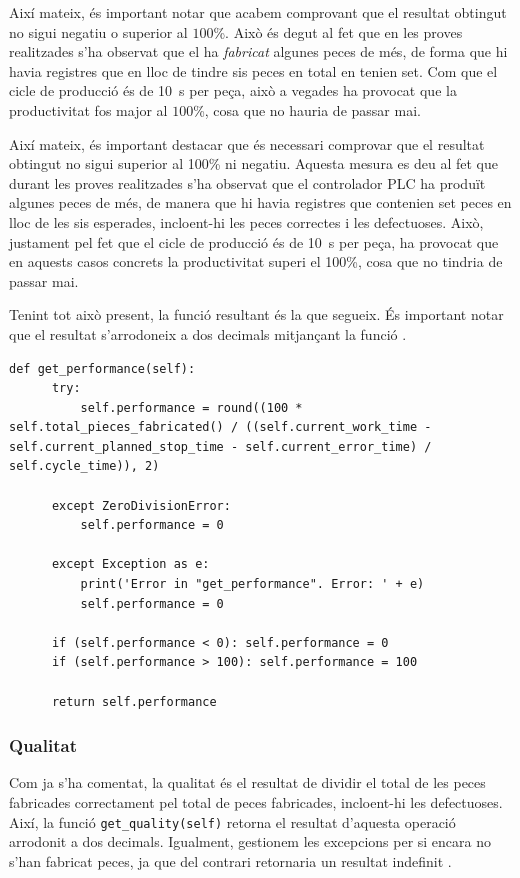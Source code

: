 \documentclass{tfgitic}[2022/06/30]
\begin{document}
Així mateix, és important notar que acabem comprovant que el resultat obtingut no sigui negatiu o superior al $100$\%. Això és degut al fet que en les proves realitzades s'ha observat que el  ha \emph{fabricat} algunes peces de més, de forma que hi havia registres que en lloc de tindre sis peces en total en tenien set. Com que el cicle de producció és de \SI{10}{s} per peça, això a vegades ha provocat que la productivitat fos major al $100$\%, cosa que no hauria de passar mai.

Així mateix, és important destacar que és necessari comprovar que el resultat obtingut no sigui superior al 100\% ni negatiu. Aquesta mesura es deu al fet que durant les proves realitzades s'ha observat que el controlador PLC ha produït algunes peces de més, de manera que hi havia registres que contenien set peces en lloc de les sis esperades, incloent-hi les peces correctes i les defectuoses. Això, justament pel fet que el cicle de producció és de \SI{10}{s} per peça, ha provocat que en aquests casos concrets la productivitat superi el 100\%, cosa que no tindria de passar mai.

Tenint tot això present, la funció resultant és la que segueix. És important notar que el resultat s'arrodoneix a dos decimals mitjançant la funció  \cite{pythondoc:round}.

\begin{lstlisting}[style = Python]
def get_performance(self):
      try:
          self.performance = round((100 * self.total_pieces_fabricated() / ((self.current_work_time - self.current_planned_stop_time - self.current_error_time) / self.cycle_time)), 2)
          
      except ZeroDivisionError:
          self.performance = 0
          
      except Exception as e:
          print('Error in "get_performance". Error: ' + e)
          self.performance = 0
          
      if (self.performance < 0): self.performance = 0
      if (self.performance > 100): self.performance = 100
      
      return self.performance
\end{lstlisting}

\subsubsection{Qualitat}
Com ja s'ha comentat, la qualitat és el resultat de dividir el total de les peces fabricades correctament pel total de peces fabricades, incloent-hi les defectuoses. Així, la funció \texttt{get\_quality(self)} retorna el resultat d'aquesta operació arrodonit a dos decimals. Igualment, gestionem les excepcions per si encara no s'han fabricat peces, ja que del contrari retornaria un resultat indefinit \cite{hopital}.
\end{document}
